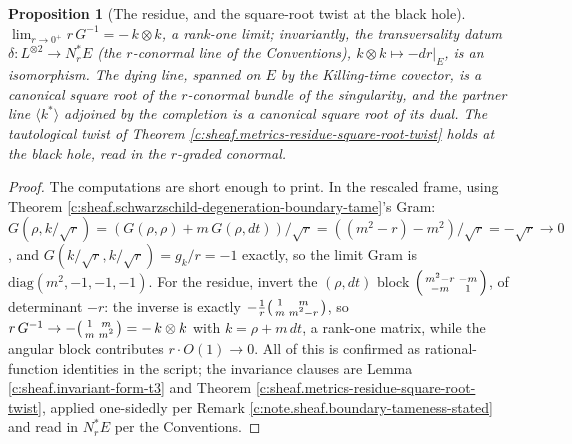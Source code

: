\documentclass[11pt]{article}
\newtheorem{proposition}[theorem]{Proposition}
\theoremstyle{definition}
\theoremstyle{plain}
\providecommand{\dtPG}{}\renewcommand{\dtPG}{dt}
\providecommand{\shL}{}\renewcommand{\shL}{L}
\begin{document}
\begin{proposition}[The residue, and the square-root twist at the black hole]\label{c:sheaf.residue-square-root-twist-black-hole}
$\displaystyle \lim_{r \to 0^+} r\,G^{-1} = -\,k \otimes k$, a rank-one limit; invariantly, the transversality datum $\delta : \shL^{\otimes 2} \to N^*_rE$ (the $r$-conormal line of the Conventions), $k \otimes k \mapsto -dr|_E$, is an isomorphism. The dying line, spanned on $E$ by the Killing-time covector, is a canonical square root of the $r$-conormal bundle of the singularity, and the partner line $\langle k^* \rangle$ adjoined by the completion is a canonical square root of its dual. The tautological twist of Theorem \ref{c:sheaf.metrics-residue-square-root-twist} holds at the black hole, read in the $r$-graded conormal.
\end{proposition}
\begin{proof}
The computations are short enough to print. In the rescaled frame, using Theorem \ref{c:sheaf.schwarzschild-degeneration-boundary-tame}'s Gram: $G(\rho, k/\sqrt r) = (G(\rho,\rho) + m\,G(\rho,\dtPG))/\sqrt r = ((m^2 - r) - m^2)/\sqrt r = -\sqrt r \to 0$, and $G(k/\sqrt r, k/\sqrt r) = g_k/r = -1$ exactly, so the limit Gram is $\mathrm{diag}(m^2, -1, -1, -1)$. For the residue, invert the $(\rho, \dtPG)$ block $\begin{psmallmatrix} m^2 - r & -m \\ -m & 1 \end{psmallmatrix}$, of determinant $-r$: the inverse is exactly $-\tfrac1r \begin{psmallmatrix} 1 & m \\ m & m^2 - r \end{psmallmatrix}$, so $r\,G^{-1} \to -\begin{psmallmatrix} 1 & m \\ m & m^2 \end{psmallmatrix} = -\,k \otimes k$ with $k = \rho + m\,\dtPG$, a rank-one matrix, while the angular block contributes $r \cdot O(1) \to 0$. All of this is confirmed as rational-function identities in the script; the invariance clauses are Lemma \ref{c:sheaf.invariant-form-t3} and Theorem \ref{c:sheaf.metrics-residue-square-root-twist}, applied one-sidedly per Remark \ref{c:note.sheaf.boundary-tameness-stated} and read in $N^*_rE$ per the Conventions.

\end{proof}
\end{document}
